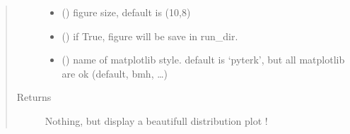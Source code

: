 \documentclass[letterpaper,10pt,english]{sphinxmanual}
\begin{document}
\begin{fulllineitems}
\begin{quote}
\begin{description}
\begin{itemize}
\item {} 
\sphinxAtStartPar
{} () \textendash{} figure size, default is (10,8)

\item {} 
\sphinxAtStartPar
{} () \textendash{} if True, figure will be save in run\_dir.

\item {} 
\sphinxAtStartPar
{} () \textendash{} name of matplotlib style. default is ‘pyterk’, but all matplotlib are ok (default, bmh, …)

\end{itemize}

\item[{Returns}] \leavevmode
\sphinxAtStartPar
Nothing, but display a beautifull distribution plot !

\end{description}\end{quote}

\end{fulllineitems}

\end{document}
